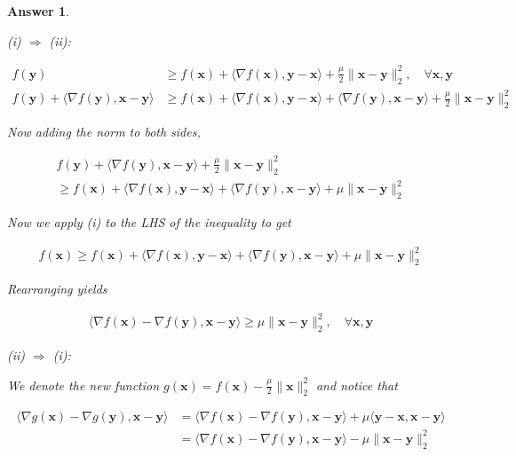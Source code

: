 \documentclass[12pt]{article}
\theoremstyle{colon}
\newtheorem*{answer}{Answer}
\begin{document}
\begin{answer}
  \

  (i) $\Rightarrow$ (ii):

  \begin{align*}
    f(\bm{y}) &\geq f(\bm{x}) + \langle \nabla f(\bm{x}), \bm{y} - \bm{x} \rangle + \frac{\mu}{2} \lVert \bm{x} - \bm{y} \rVert_2^2, \quad \forall \bm{x}, \bm{y} \\
    f(\bm{y}) + \langle \nabla f(\bm{y}), \bm{x} - \bm{y} \rangle &\geq f(\bm{x}) + \langle \nabla f(\bm{x}), \bm{y} - \bm{x} \rangle + \langle \nabla f(\bm{y}), \bm{x} - \bm{y} \rangle + \frac{\mu}{2} \lVert \bm{x} - \bm{y} \rVert_2^2
  \end{align*}

  Now adding the norm to both sides,

  \begin{gather*}
    f(\bm{y}) + \langle \nabla f(\bm{y}), \bm{x} - \bm{y} \rangle + \frac{\mu}{2} \lVert \bm{x} - \bm{y} \rVert_2^2 \\
    \geq f(\bm{x}) + \langle \nabla f(\bm{x}), \bm{y} - \bm{x} \rangle + \langle \nabla f(\bm{y}), \bm{x} - \bm{y} \rangle + \mu \lVert \bm{x} - \bm{y} \rVert_2^2
  \end{gather*}

  Now we apply (i) to the LHS of the inequality to get

  \begin{gather*}
    f(\bm{x}) \geq f(\bm{x}) + \langle \nabla f(\bm{x}), \bm{y} - \bm{x} \rangle + \langle \nabla f(\bm{y}), \bm{x} - \bm{y} \rangle + \mu \lVert \bm{x} - \bm{y} \rVert_2^2
  \end{gather*}

  Rearranging yields

  \begin{gather*}
    \langle \nabla f(\bm{x}) - \nabla f(\bm{y}), \bm{x} - \bm{y} \rangle \geq \mu \lVert \bm{x} - \bm{y} \rVert_2^2, \quad \forall \bm{x}, \bm{y}
  \end{gather*}

  \clearpage

  (ii) $\Rightarrow$ (i):

  We denote the new function $g(\bm{x}) = f(\bm{x}) - \frac{\mu}{2} \lVert \bm{x} \rVert_2^2$ and notice that

  \begin{align*}
    \langle \nabla g(\bm{x}) - \nabla g(\bm{y}), \bm{x} - \bm{y} \rangle &= \langle \nabla f(\bm{x}) - \nabla f(\bm{y}), \bm{x} - \bm{y} \rangle + \mu \langle \bm{y} - \bm{x}, \bm{x} - \bm{y} \rangle \\
    &= \langle \nabla f(\bm{x}) - \nabla f(\bm{y}), \bm{x} - \bm{y} \rangle - \mu \lVert \bm{x} - \bm{y} \rVert_2^2
  \end{align*}


\end{answer}
\end{document}
